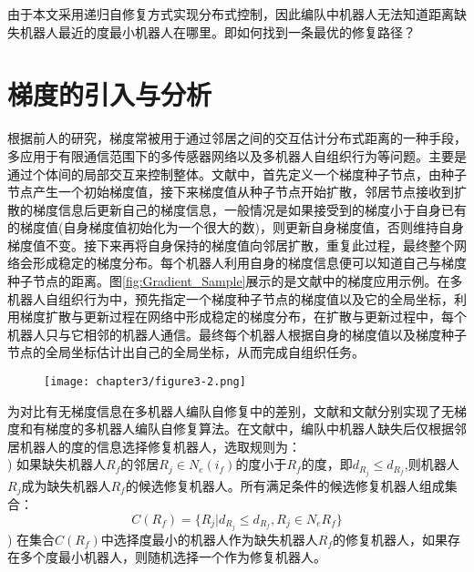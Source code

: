 由于本文采用递归自修复方式实现分布式控制，因此编队中机器人无法知道距离缺失机器人最近的度最小机器人在哪里。即如何找到一条最优的修复路径？

\section{梯度的引入与分析}
根据前人的研究，梯度常被用于通过邻居之间的交互估计分布式距离的一种手段\supercite{SciencePaper,nagpal2003organizing,stoy2006using,rubenstein2012kilobot,meng2011autonomous,terada2008automatic}，多应用于有限通信范围下的多传感器网络\supercite{nagpal2003organizing}以及多机器人自组织行为\supercite{SciencePaper,stoy2006using}等问题。主要是通过个体间的局部交互来控制整体。文献\parencite{SciencePaper,stoy2006using,rubenstein2012kilobot,terada2008automatic}中，首先定义一个梯度种子节点，由种子节点产生一个初始梯度值，接下来梯度值从种子节点开始扩散，邻居节点接收到扩散的梯度信息后更新自己的梯度信息，一般情况是如果接受到的梯度小于自身已有的梯度值(自身梯度值初始化为一个很大的数)，则更新自身梯度值，否则维持自身梯度值不变。接下来再将自身保持的梯度值向邻居扩散，重复此过程，最终整个网络会形成稳定的梯度分布。每个机器人利用自身的梯度信息便可以知道自己与梯度种子节点的距离。图\ref{fig:Gradient_Sample}展示的是文献\parencite{SciencePaper}中的梯度应用示例。在多机器人自组织行为中，预先指定一个梯度种子节点的梯度值以及它的全局坐标，利用梯度扩散与更新过程在网络中形成稳定的梯度分布，在扩散与更新过程中，每个机器人只与它相邻的机器人通信。最终每个机器人根据自身的梯度值以及梯度种子节点的全局坐标估计出自己的全局坐标，从而完成自组织任务。
\begin{figure}[!htbp]
	\centering
	\texttt{[image: chapter3/figure3-2.png]}
\end{figure}

为对比有无梯度信息在多机器人编队自修复中的差别，文献\parencite{张飞2008移动机器人覆盖问题的研究}和文献\parencite{liu2015gradient}分别实现了无梯度和有梯度的多机器人编队自修复算法。在文献\parencite{张飞2008移动机器人覆盖问题的研究}中，编队中机器人缺失后仅根据邻居机器人的度的信息选择修复机器人，选取规则为：\\
) 如果缺失机器人$R_f$的邻居$R_j \in N_e(i_f)$的度小于$R_f$的度，即$d_{R_j} \leq d_{R_f}$,则机器人$R_j$成为缺失机器人$R_f$的候选修复机器人。所有满足条件的候选修复机器人组成集合：\\
\begin{equation}
	C(R_f) = \{ R_j | d_{R_j} \leq d_{R_f}, R_j \in N_e{R_f} \} 
\end{equation} 
) 在集合$C(R_f)$中选择度最小的机器人作为缺失机器人$R_f$的修复机器人，如果存在多个度最小机器人，则随机选择一个作为修复机器人。\\

